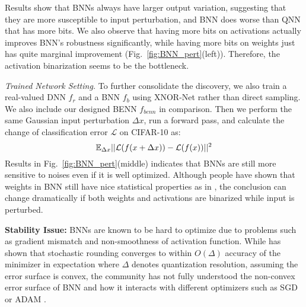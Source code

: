 \documentclass[10pt,twocolumn,letterpaper]{article}
\begin{document}
Results show that BNNs always have larger output variation, suggesting that they are more susceptible to input perturbation, and BNN does worse than QNN that has more bits. We also observe that having more bits on activations actually improves BNN's robustness significantly, while having more bits on weights just has quite marginal improvement (Fig.~\ref{fig:BNN_pert}(left)). Therefore, the activation binarization seems to be the bottleneck. 

\emph{Trained Network Setting.} To further consolidate the discovery, we also train a real-valued DNN $f_{r}$ and a BNN $f_{b}$ using XNOR-Net \cite{rastegari2016xnor} rather than direct sampling. We also include our designed BENN $f_{benn}$ in comparison. Then we perform the same Gaussian input perturbation $\Delta x$, run a forward pass, and calculate the change of classification error $\mathcal{L}$ on CIFAR-10 as:
\vspace{-1mm}
\begin{equation}
    \mathbb E_{\Delta x}||\mathcal{L}(f(x+\Delta x))-\mathcal{L}(f(x))||^{2}
    \vspace{-1mm}
\end{equation}
Results in Fig.~\ref{fig:BNN_pert}(middle) indicates that BNNs are still more sensitive to noises even if it is well optimized. %
Although people have shown that weights in BNN still have nice statistical properties as in \cite{anderson2017high}, the conclusion can change dramatically if both weights and activations are binarized while input is perturbed.%

\textbf{Stability Issue:} BNNs are known to be hard to optimize due to problems such as gradient mismatch and non-smoothness of activation function. While \cite{li2017training} has shown that stochastic rounding converges to within $O(\Delta)$ accuracy of the minimizer in expectation where $\Delta$ denotes quantization resolution, assuming the error surface is convex,
the community has not fully understood the non-convex error surface of BNN and how it interacts with different optimizers such as SGD or ADAM \cite{kingma2014adam}. %
\end{document}
